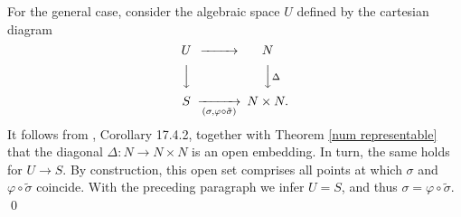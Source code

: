 \documentclass[oneside, 12pt]{amsart}
\theoremstyle{definition}
\theoremstyle{remark}
\newcommand{\shI}{\mathscr{I}}
\newcommand{\shJ}{\mathscr{J}}
\newcommand{\maxid}{\mathfrak{m}}
\renewcommand{\O}{\mathscr{O}}
\newcommand{\ra}{\rightarrow}
\begin{document}
For the general case, consider the algebraic space $U$ defined by the cartesian diagram
$$
\begin{CD}
U	@>>>				N\\
@VVV					@VV\Delta V\\
S	@>>(\sigma,\varphi\circ\tilde{\sigma})>	N\times N.
\end{CD}
$$
It follows from \cite{EGA IVd}, Corollary 17.4.2, together with Theorem \ref{num representable} that the diagonal $\Delta:N\ra N\times N$ is an open embedding.
In turn, the same holds for $U\ra S$. By construction, this open set comprises all points at which $\sigma$ and $\varphi\circ\tilde{\sigma}$ coincide.
With the preceding paragraph we infer $U=S$, and thus $\sigma=\varphi\circ\tilde{\sigma}$.
% 
% 
\qed
\end{document}
